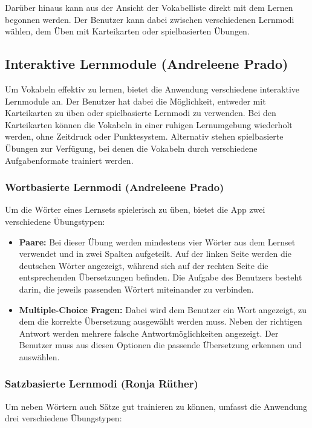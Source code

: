 Darüber hinaus kann aus der Ansicht der Vokabelliste direkt mit dem Lernen begonnen werden.
Der Benutzer kann dabei zwischen verschiedenen Lernmodi wählen, dem Üben mit Karteikarten oder spielbasierten Übungen.

\subsection{Interaktive Lernmodule (Andreleene Prado)}
Um Vokabeln effektiv zu lernen, bietet die Anwendung verschiedene interaktive Lernmodule an.
Der Benutzer hat dabei die Möglichkeit, entweder mit Karteikarten zu üben oder spielbasierte Lernmodi zu verwenden.
Bei den Karteikarten können die Vokabeln in einer ruhigen Lernumgebung wiederholt werden, ohne Zeitdruck oder Punktesystem.
Alternativ stehen spielbasierte Übungen zur Verfügung, bei denen die Vokabeln durch verschiedene Aufgabenformate trainiert werden.

\subsubsection{Wortbasierte Lernmodi (Andreleene Prado)}
Um die Wörter eines Lernsets spielerisch zu üben, bietet die App zwei verschiedene Übungstypen:

\begin{itemize}
\item \textbf{Paare:} Bei dieser Übung werden mindestens vier Wörter aus dem Lernset verwendet und in zwei Spalten aufgeteilt.
Auf der linken Seite werden die deutschen Wörter angezeigt, während sich auf der rechten Seite die entsprechenden Übersetzungen befinden.
Die Aufgabe des Benutzers besteht darin, die jeweils passenden Wörtert miteinander zu verbinden.
\item \textbf{Multiple-Choice Fragen:} Dabei wird dem Benutzer ein Wort angezeigt, zu dem die korrekte Übersetzung ausgewählt werden muss.
Neben der richtigen Antwort werden mehrere falsche Antwortmöglichkeiten angezeigt. Der Benutzer muss aus diesen Optionen die passende Übersetzung erkennen und auswählen.
\end{itemize}

\subsubsection{Satzbasierte Lernmodi (Ronja Rüther)}
Um neben Wörtern auch Sätze gut trainieren zu können, umfasst die Anwendung drei verschiedene Übungstypen:

